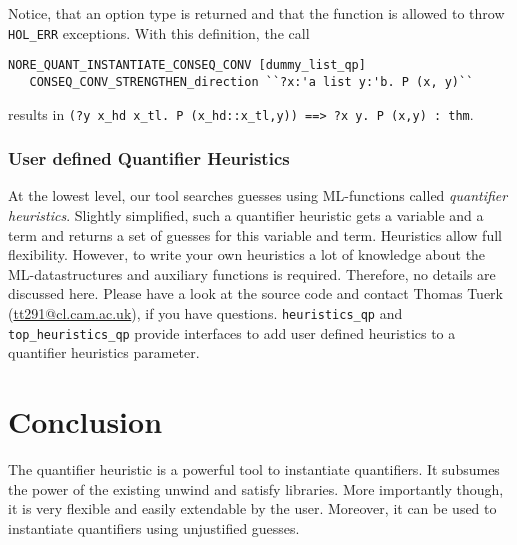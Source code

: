 \documentclass[a4paper,12pt,DIV=12,oneside]{scrbook}
\theoremstyle{definition}
\theoremstyle{remark}
\begin{document}
\noindent
Notice, that an option type is returned and that the function is
allowed to throw \texttt{HOL\_ERR} exceptions.
With this definition, the call
\begin{verbatim}
NORE_QUANT_INSTANTIATE_CONSEQ_CONV [dummy_list_qp]
   CONSEQ_CONV_STRENGTHEN_direction ``?x:'a list y:'b. P (x, y)``
\end{verbatim}
results in
\verb+(?y x_hd x_tl. P (x_hd::x_tl,y)) ==> ?x y. P (x,y) : thm+.

\subsection{User defined Quantifier Heuristics}\label{subsec_user_defined_quantheu}

At the lowest level, our tool searches guesses using ML-functions
called \emph{quantifier heuristics}. Slightly simplified, such a
quantifier heuristic gets a variable and a term and returns a set of
guesses for this variable and term. Heuristics allow full
flexibility. However, to write your own heuristics a lot of knowledge
about the ML-datastructures and auxiliary functions is
required. Therefore, no details are discussed here. Please have a look
at the source code and contact Thomas Tuerk
(\url{tt291@cl.cam.ac.uk}), if you have questions.
\texttt{heuristics\_qp} and \texttt{top\_heuristics\_qp} provide
interfaces to add user defined heuristics to a quantifier heuristics
parameter.

\chapter{Conclusion}\label{sec_conclusion}

The quantifier heuristic is a powerful tool to instantiate quantifiers.
It subsumes the power of the existing unwind and satisfy libraries. More importantly though,
it is very flexible and easily extendable by the user. Moreover,
it can be used to instantiate quantifiers using unjustified guesses.



\end{document}
